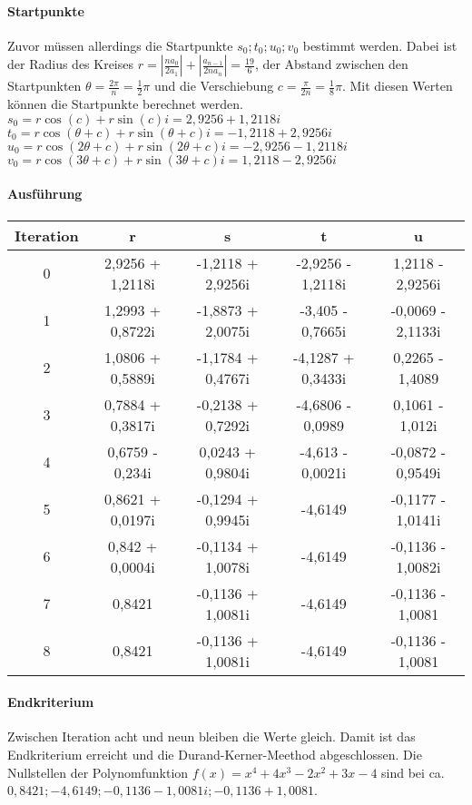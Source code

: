 \documentclass[12pt]{article}
\begin{document}
\paragraph{Startpunkte}
Zuvor müssen allerdings die Startpunkte $s_0;t_0;u_0;v_0$ bestimmt werden. Dabei ist der Radius des Kreises $r = |\frac{na_0}{2a_1}| + |\frac{a_{n-1}}{2na_n}| = \frac{19}{6}$, der Abstand zwischen den Startpunkten $\theta = \frac{2\pi}{n} = \frac{1}{2}\pi$ und die Verschiebung $c = \frac{\pi}{2n} = \frac{1}{8}\pi$. Mit diesen Werten können die Startpunkte berechnet werden. \\
$s_0 = r \cos(c) + r \sin(c)i = 2,9256 + 1,2118i$ \\
$t_0 = r \cos(\theta+c) + r \sin(\theta+c)i = -1,2118 + 2,9256i$ \\
$u_0 = r \cos(2\theta+c) + r \sin(2\theta+c)i = -2,9256 - 1,2118i$ \\
$v_0 = r \cos(3\theta+c) + r \sin(3\theta+c)i = 1,2118 - 2,9256i$

\paragraph{Ausführung}
\begin{center}
\begin{tabular}{c|c c c c}
    Iteration & r & s & t & u \\
    \hline
    0 & 2,9256 + 1,2118i & -1,2118 + 2,9256i & -2,9256 - 1,2118i & 1,2118 - 2,9256i \\
    1 & 1,2993 + 0,8722i & -1,8873 + 2,0075i & -3,405 - 0,7665i & -0,0069 - 2,1133i \\
    2 & 1,0806 + 0,5889i & -1,1784 + 0,4767i & -4,1287 + 0,3433i & 0,2265 - 1,4089 \\
    3 & 0,7884 + 0,3817i & -0,2138 + 0,7292i & -4,6806 - 0,0989 & 0,1061 - 1,012i \\
    4 & 0,6759 - 0,234i & 0,0243 + 0,9804i & -4,613 - 0,0021i & -0,0872 - 0,9549i \\
    5 & 0,8621 + 0,0197i & -0,1294 + 0,9945i & -4,6149 & -0,1177 - 1,0141i \\
    6 & 0,842 + 0,0004i & -0,1134 + 1,0078i & -4,6149 & -0,1136 - 1,0082i \\
    7 & 0,8421 & -0,1136 + 1,0081i & -4,6149 & -0,1136 - 1,0081 \\
    8 & 0,8421 & -0,1136 + 1,0081i & -4,6149 & -0,1136 - 1,0081 \\
\end{tabular}
\end{center}
\paragraph{Endkriterium}
Zwischen Iteration acht und neun bleiben die Werte gleich. Damit ist das Endkriterium erreicht und die Durand-Kerner-Meethod abgeschlossen. 
Die Nullstellen der Polynomfunktion $f(x) = x^4 + 4x^3 - 2x^2 + 3x - 4$ sind bei ca. $0,8421; -4,6149; -0,1136 - 1,0081i; -0,1136 + 1,0081$. 
\end{document}
